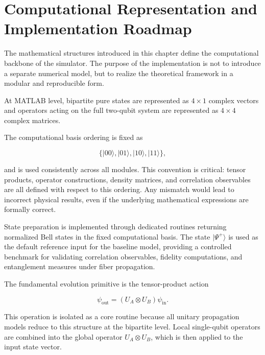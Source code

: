 
\section{Computational Representation and Implementation Roadmap}

The mathematical structures introduced in this chapter define the computational backbone of the simulator. The purpose of the implementation is not to introduce a separate numerical model, but to realize the theoretical framework in a modular and reproducible form.

\medskip

At MATLAB level, bipartite pure states are represented as \(4 \times 1\) complex vectors and operators acting on the full two-qubit system are represented as \(4 \times 4\) complex matrices.

The computational basis ordering is fixed as

\[
\{|00\rangle, |01\rangle, |10\rangle, |11\rangle\},
\]

and is used consistently across all modules. This convention is critical: tensor products, operator constructions, density matrices, and correlation observables are all defined with respect to this ordering. Any mismatch would lead to incorrect physical results, even if the underlying mathematical expressions are formally correct.

\medskip

State preparation is implemented through dedicated routines returning normalized Bell states in the fixed computational basis. The state \( |\Psi^+\rangle \) is used as the default reference input for the baseline model, providing a controlled benchmark for validating correlation observables, fidelity computations, and entanglement measures under fiber propagation.

\medskip

The fundamental evolution primitive is the tensor-product action

\[
\psi_{\mathrm{out}}
=
(U_A \otimes U_B)\psi_{\mathrm{in}}.
\]

This operation is isolated as a core routine because all unitary propagation models reduce to this structure at the bipartite level. Local single-qubit operators are combined into the global operator \( U_A \otimes U_B \), which is then applied to the input state vector.

